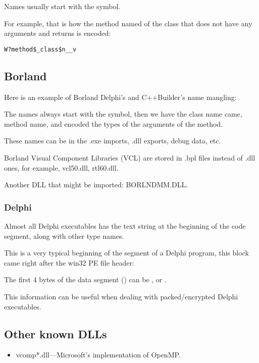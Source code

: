 Names usually start with the  symbol.

For example, that is how the method named  of the class  that does not have any arguments and returns
\Tvoid is encoded:

\begin{lstlisting}
W?method$_class$n__v
\end{lstlisting}

\subsection{Borland}

Here is an example of Borland Delphi's and C++Builder's \gls{name mangling}:



The names always start with the  
symbol, then we have the class name came, method name, and encoded the types of the arguments of the method.

These names can be in the .exe imports, .dll exports, debug data, etc.

Borland Visual Component Libraries (VCL) 
are stored in .bpl files instead of .dll ones, for example, vcl50.dll, rtl60.dll.

Another DLL that might be imported: BORLNDMM.DLL.

\subsubsection{Delphi}

Almost all Delphi executables has the  text string at the beginning of the code segment, along with other type names.

This is a very typical beginning of the  
segment of a Delphi program, this block came right after the win32 PE file header:



The first 4 bytes of the data segment () can be ,  or .%

This information can be useful when dealing with packed/encrypted Delphi executables.

\subsection{Other known DLLs}

\begin{itemize}
\item vcomp*.dll---Microsoft's implementation of OpenMP.
\end{itemize}

